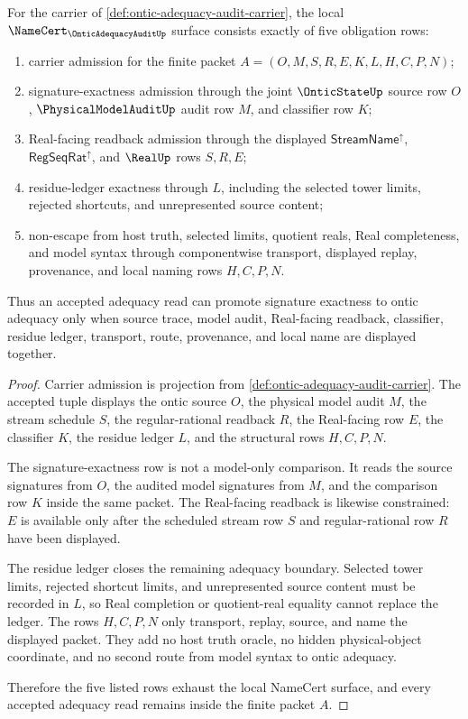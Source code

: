 \begin{theorem}
\label{thm:ontic-adequacy-audit-namecert-obligations}
For the carrier of \autoref{def:ontic-adequacy-audit-carrier}, the local $\NameCert_{\OnticAdequacyAuditUp}$ surface consists exactly of five obligation rows:
\begin{enumerate}
\item carrier admission for the finite packet $A=(O,M,S,R,E,K,L,H,C,P,N)$;
\item signature-exactness admission through the joint $\OnticStateUp$ source row $O$, $\PhysicalModelAuditUp$ audit row $M$, and classifier row $K$;
\item Real-facing readback admission through the displayed $\mathsf{StreamName}^{\uparrow}$, $\mathsf{RegSeqRat}^{\uparrow}$, and $\RealUp$ rows $S,R,E$;
\item residue-ledger exactness through $L$, including the selected tower limits, rejected shortcuts, and unrepresented source content;
\item non-escape from host truth, selected limits, quotient reals, Real completeness, and model syntax through componentwise transport, displayed replay, provenance, and local naming rows $H,C,P,N$.
\end{enumerate}
Thus an accepted adequacy read can promote signature exactness to ontic adequacy only when source trace, model audit, Real-facing readback, classifier, residue ledger, transport, route, provenance, and local name are displayed together.
\end{theorem}
\begin{proof}
Carrier admission is projection from \autoref{def:ontic-adequacy-audit-carrier}. The accepted tuple displays the ontic source $O$, the physical model audit $M$, the stream schedule $S$, the regular-rational readback $R$, the Real-facing row $E$, the classifier $K$, the residue ledger $L$, and the structural rows $H,C,P,N$.

The signature-exactness row is not a model-only comparison. It reads the source signatures from $O$, the audited model signatures from $M$, and the comparison row $K$ inside the same packet. The Real-facing readback is likewise constrained: $E$ is available only after the scheduled stream row $S$ and regular-rational row $R$ have been displayed.

The residue ledger closes the remaining adequacy boundary. Selected tower limits, rejected shortcut limits, and unrepresented source content must be recorded in $L$, so Real completion or quotient-real equality cannot replace the ledger. The rows $H,C,P,N$ only transport, replay, source, and name the displayed packet. They add no host truth oracle, no hidden physical-object coordinate, and no second route from model syntax to ontic adequacy.

Therefore the five listed rows exhaust the local NameCert surface, and every accepted adequacy read remains inside the finite packet $A$.
\end{proof}

